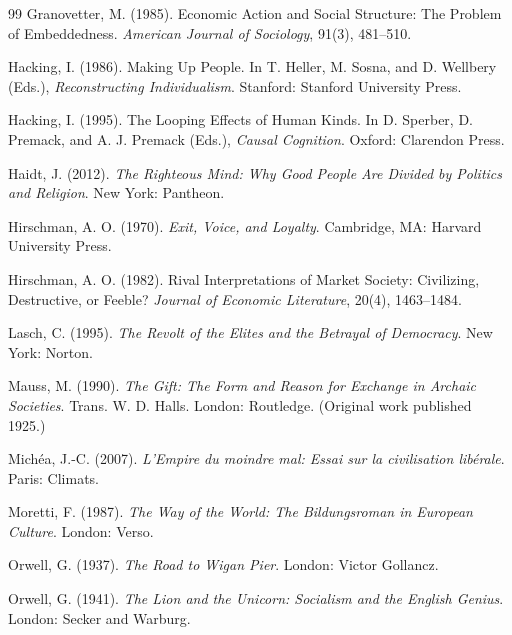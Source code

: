 \documentclass[12pt]{article}
\begin{document}
\begin{thebibliography}{99}
Granovetter, M. (1985).
\newblock Economic Action and Social Structure: The Problem of Embeddedness.
\newblock \emph{American Journal of Sociology}, 91(3), 481--510.

Hacking, I. (1986).
\newblock Making Up People.
\newblock In T. Heller, M. Sosna, and D. Wellbery (Eds.), \emph{Reconstructing Individualism}. Stanford: Stanford University Press.

Hacking, I. (1995).
\newblock The Looping Effects of Human Kinds.
\newblock In D. Sperber, D. Premack, and A. J. Premack (Eds.), \emph{Causal Cognition}. Oxford: Clarendon Press.

Haidt, J. (2012).
\newblock \emph{The Righteous Mind: Why Good People Are Divided by Politics and Religion}.
\newblock New York: Pantheon.

Hirschman, A. O. (1970).
\newblock \emph{Exit, Voice, and Loyalty}.
\newblock Cambridge, MA: Harvard University Press.

Hirschman, A. O. (1982).
\newblock Rival Interpretations of Market Society: Civilizing, Destructive, or Feeble?
\newblock \emph{Journal of Economic Literature}, 20(4), 1463--1484.

Lasch, C. (1995).
\newblock \emph{The Revolt of the Elites and the Betrayal of Democracy}.
\newblock New York: Norton.

Mauss, M. (1990).
\newblock \emph{The Gift: The Form and Reason for Exchange in Archaic Societies}.
\newblock Trans. W. D. Halls. London: Routledge. (Original work published 1925.)

Mich\'ea, J.-C. (2007).
\newblock \emph{L'Empire du moindre mal: Essai sur la civilisation lib\'erale}.
\newblock Paris: Climats.

Moretti, F. (1987).
\newblock \emph{The Way of the World: The Bildungsroman in European Culture}.
\newblock London: Verso.

Orwell, G. (1937).
\newblock \emph{The Road to Wigan Pier}.
\newblock London: Victor Gollancz.

Orwell, G. (1941).
\newblock \emph{The Lion and the Unicorn: Socialism and the English Genius}.
\newblock London: Secker and Warburg.


\end{thebibliography}
\end{document}
